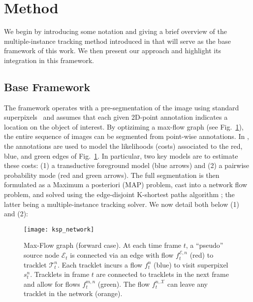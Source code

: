 \section{Method}
\label{sec:method}
We begin by introducing some notation and giving a brief overview of the multiple-instance tracking method introduced in \cite{lejeune18} that will serve as the base framework of this work. We then present our approach and highlight its integration in this framework.

\subsection{Base Framework}
The framework operates with a pre-segmentation of the image using standard superpixels~\cite{achanta12} and assumes that each given 2D-point annotation indicates a location on the object of interest. By optiziming a max-flow graph (see Fig.~\ref{fig:ksp_network}), the entire sequence of images can be segmented from point-wise annotations. In \cite{lejeune18}, the annotations are used to model the likelihoods (costs) associated to the red, blue, and green edges of Fig.~\ref{fig:ksp_network}. In particular, two key models are to estimate these costs: (1) a transductive foreground model (blue arrows) and (2) a pairwise probability mode (red and green arrows). The full segmentation is then formulated as a Maximum a posteriori (MAP) problem, cast into a network flow problem, and solved using the edge-disjoint K-shortest paths algorithm \cite{berclaz11}; the latter being a multiple-instance tracking solver. We now detail both below (1) and (2):
\begin{figure}[t]
\centering
\texttt{[image: ksp\_network]}
\caption{Max-Flow graph (forward case). At each time frame $t$, a ``pseudo'' source node $\mathcal{E}_t$ is connected via an edge with flow $f_{t}^{\mathcal{E},n}$ (red) to tracklet $\mathcal{T}_t^n$. Each tracklet incurs a flow $f_t^n$ (blue) to visit superpixel $s_t^n$. Tracklets in frame $t$ are connected to tracklets in the next frame and allow for flows $f_{t}^{m,n}$ (green). The flow $f_{t}^{n,\mathcal{X}}$ can leave any tracklet in the network (orange).}
\label{fig:ksp_network}
\end{figure}

